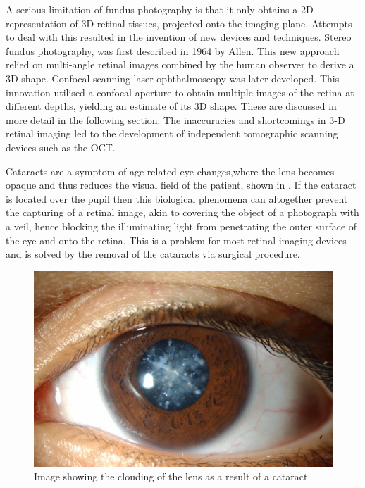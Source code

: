 A serious limitation of fundus photography is that it only obtains a 2D representation of 3D retinal tissues, projected onto the imaging plane. Attempts to deal with this resulted in the invention of new devices and techniques. Stereo fundus photography, was first described in 1964 by Allen.\cite{allen1964ocular} This new approach relied on multi-angle retinal images combined by the human observer to derive a 3D shape. Confocal scanning laser ophthalmoscopy was later developed. This innovation utilised a confocal aperture to obtain multiple images of the retina at different depths, yielding an estimate of its 3D shape. These are discussed in more detail in the following section.\cite{webb1987confocal}
The inaccuracies and shortcomings in 3-D retinal imaging
led to the development of independent tomographic scanning devices such as the OCT.

Cataracts are a symptom of age related eye changes,where 
the lens becomes opaque and thus reduces the visual field of the patient,
shown in . If the cataract is located over the pupil then this
biological phenomena can altogether prevent the capturing of a retinal image,
akin to covering the object of a photograph with a veil, hence blocking the
illuminating light from penetrating the outer surface of the eye and onto the
retina. This is a problem for most retinal imaging devices 
and is solved by the removal of the cataracts via surgical procedure. 

\begin{figure}[htbp]
\centering
\includegraphics{figures/cataract}
\caption{Image showing the clouding of the lens as a result of a cataract}
\label{fig:cat}
   \end{figure}

